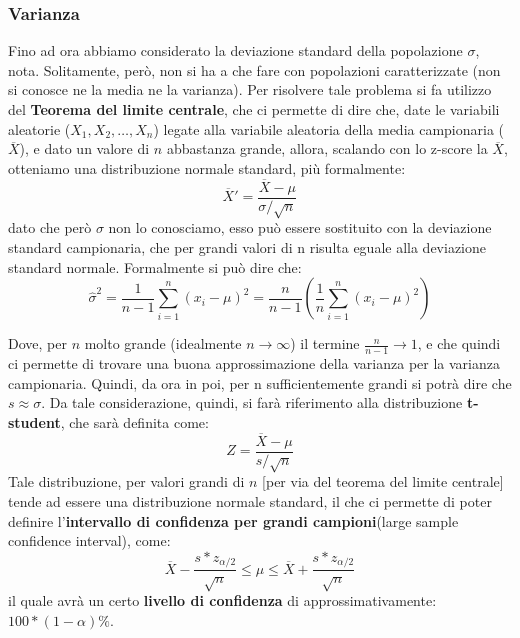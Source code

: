 \subsubsection{Varianza}
Fino ad ora abbiamo considerato la deviazione standard della popolazione \(\sigma\), nota. Solitamente, però, non si ha a che fare con popolazioni caratterizzate (non si conosce ne la media ne la varianza). Per risolvere tale problema si fa utilizzo del \textbf{Teorema del limite centrale}, che ci permette di dire che, date le variabili aleatorie (\(X_1,X_2,\dots,X_n\)) legate alla variabile aleatoria della media campionaria (\(\overline{X}\)), e dato un valore di \(n\) abbastanza grande, allora, scalando con lo z-score la \(\overline{X}\), otteniamo una distribuzione normale standard, più formalmente:
\[
\overline{X}' = \frac{\overline{X} - \mu}{\sigma/\sqrt{n}}
\]
dato che però \(\sigma\) non lo conosciamo, esso può essere sostituito con la deviazione standard campionaria, che per grandi valori di n risulta eguale alla deviazione standard normale. Formalmente si può dire che:
\[
\hat{\sigma}^2 = \frac{1}{n-1}\sum_{i=1}^{n}(x_i - \mu)^2 = \frac{n}{n-1}\left ( \frac{1}{n} \sum_{i=1}^{n}(x_i - \mu)^2\right )
\]

Dove, per \(n\) molto grande (idealmente \(n \to \infty\)) il termine \(\frac{n}{n-1} \to 1\), e che quindi ci permette di trovare una buona approssimazione della varianza per la varianza campionaria. Quindi, da ora in poi, per n sufficientemente grandi si potrà dire che \(s \approx \sigma\).
Da tale considerazione, quindi, si farà riferimento alla distribuzione \textbf{t-student}, che sarà definita come:
\[
Z = \frac{\overline{X} - \mu}{s/\sqrt{n}}
\]
Tale distribuzione, per valori grandi di \(n\) [per via del teorema del limite centrale] tende ad essere una distribuzione normale standard, il che ci permette di poter definire l'\textbf{intervallo di confidenza per grandi campioni}(large sample confidence interval), come:
\[
\overline{X} - \frac{s * z_{\alpha/2}}{\sqrt{n}} \leq \mu \leq \overline{X} + \frac{s * z_{\alpha/2}}{\sqrt{n}}
\]
il quale avrà un certo \textbf{livello di confidenza} di approssimativamente: \(100*(1-\alpha)\%\).

